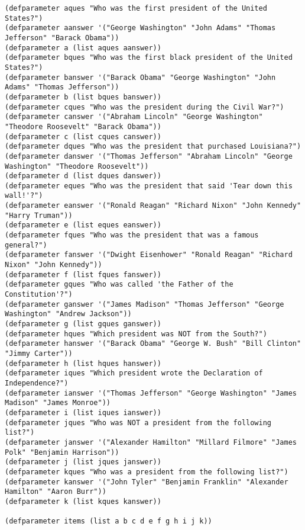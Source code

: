 \documentclass{article}
\begin{document}
\lstset{language=Lisp,numbers=left,keepspaces=false,basicstyle=\small,numberstyle=\tiny,breaklines=true,showstringspaces=false}
\begin{lstlisting}
(defparameter aques "Who was the first president of the United States?")
(defparameter aanswer '("George Washington" "John Adams" "Thomas Jefferson" "Barack Obama"))
(defparameter a (list aques aanswer))
(defparameter bques "Who was the first black president of the United States?")
(defparameter banswer '("Barack Obama" "George Washington" "John Adams" "Thomas Jefferson"))
(defparameter b (list bques banswer))
(defparameter cques "Who was the president during the Civil War?")
(defparameter canswer '("Abraham Lincoln" "George Washington" "Theodore Roosevelt" "Barack Obama"))
(defparameter c (list cques canswer))
(defparameter dques "Who was the president that purchased Louisiana?")
(defparameter danswer '("Thomas Jefferson" "Abraham Lincoln" "George Washington" "Theodore Roosevelt"))
(defparameter d (list dques danswer))
(defparameter eques "Who was the president that said 'Tear down this wall!'?")
(defparameter eanswer '("Ronald Reagan" "Richard Nixon" "John Kennedy" "Harry Truman"))
(defparameter e (list eques eanswer))
(defparameter fques "Who was the president that was a famous general?")
(defparameter fanswer '("Dwight Eisenhower" "Ronald Reagan" "Richard Nixon" "John Kennedy"))
(defparameter f (list fques fanswer))
(defparameter gques "Who was called 'the Father of the Constitution'?")
(defparameter ganswer '("James Madison" "Thomas Jefferson" "George Washington" "Andrew Jackson"))
(defparameter g (list gques ganswer))
(defparameter hques "Which president was NOT from the South?")
(defparameter hanswer '("Barack Obama" "George W. Bush" "Bill Clinton" "Jimmy Carter"))
(defparameter h (list hques hanswer))
(defparameter iques "Which president wrote the Declaration of Independence?")
(defparameter ianswer '("Thomas Jefferson" "George Washington" "James Madison" "James Monroe"))
(defparameter i (list iques ianswer))
(defparameter jques "Who was NOT a president from the following list?")
(defparameter janswer '("Alexander Hamilton" "Millard Filmore" "James Polk" "Benjamin Harrison"))
(defparameter j (list jques janswer))
(defparameter kques "Who was a president from the following list?")
(defparameter kanswer '("John Tyler" "Benjamin Franklin" "Alexander Hamilton" "Aaron Burr"))
(defparameter k (list kques kanswer))

(defparameter items (list a b c d e f g h i j k))
\end{lstlisting}
\end{document}
